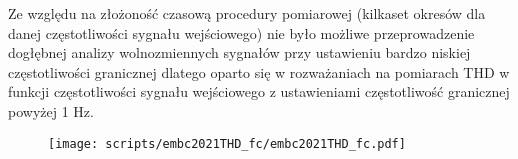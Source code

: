 \begin{frame}[t]
    \begin{block}{\tb}
    \end{block}
    Ze względu na złożoność czasową procedury pomiarowej (kilkaset okresów dla danej częstotliwości sygnału wejściowego) nie było możliwe przeprowadzenie dogłębnej analizy wolnozmiennych sygnałów przy ustawieniu bardzo niskiej częstotliwości granicznej dlatego oparto się w rozważaniach na pomiarach THD w funkcji częstotliwości sygnału wejściowego z ustawieniami częstotliwość granicznej powyżej 1 Hz.
    
    \begin{figure}[H]
        \centering
        \texttt{[image: scripts/embc2021THD\_fc/embc2021THD\_fc.pdf]}  
    \end{figure}





\end{frame}


